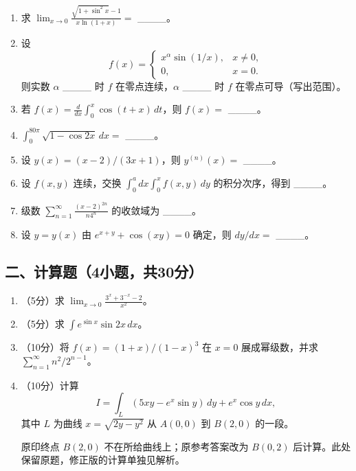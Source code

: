 \documentclass[11pt,fontset=fandol]{ctexart}
\begin{document}
\begin{enumerate}
\def\labelenumi{\arabic{enumi}.}
\item
  求 \(\displaystyle\lim_{x\to0}\frac{\sqrt{1+\sin^2x}-1}{x\ln(1+x)}=\)
  \_\_\_\_。
\item
  设 \[
  f(x)=\begin{cases}x^\alpha\sin(1/x),&x\ne0,\\0,&x=0.\end{cases}
  \] 则实数 \(\alpha\) \_\_\_\_ 时 \(f\) 在零点连续，\(\alpha\) \_\_\_\_
  时 \(f\) 在零点可导（写出范围）。
\item
  若 \(\displaystyle f(x)=\frac d{dx}\int_0^x\cos(t+x)\,dt\)，则
  \(f(x)=\) \_\_\_\_。
\item
  \(\displaystyle\int_0^{80\pi}\sqrt{1-\cos2x}\,dx=\) \_\_\_\_。
\item
  设 \(y(x)=(x-2)/(3x+1)\)，则 \(y^{(n)}(x)=\) \_\_\_\_。
\item
  设 \(f(x,y)\) 连续，交换
  \(\displaystyle\int_0^a dx\int_0^xf(x,y)\,dy\) 的积分次序，得到
  \_\_\_\_。
\item
  级数 \(\displaystyle\sum_{n=1}^\infty\frac{(x-2)^{2n}}{n4^n}\)
  的收敛域为 \_\_\_\_。
\item
  设 \(y=y(x)\) 由 \(e^{x+y}+\cos(xy)=0\) 确定，则 \(dy/dx=\) \_\_\_\_。
\end{enumerate}

\subsection{二、计算题（4小题，共30分）}\label{ux4e8cux8ba1ux7b97ux98984ux5c0fux9898ux517130ux5206}

\begin{enumerate}
\def\labelenumi{\arabic{enumi}.}
\item
  （5分）求 \(\displaystyle\lim_{x\to0}\frac{3^x+3^{-x}-2}{x^2}\)。
\item
  （5分）求 \(\displaystyle\int e^{\sin x}\sin2x\,dx\)。
\item
  （10分）将 \(f(x)=(1+x)/(1-x)^3\) 在 \(x=0\) 展成幂级数，并求
  \(\displaystyle\sum_{n=1}^\infty n^2/2^{n-1}\)。
\item
  （10分）计算 \[
  I=\int_L(5xy-e^x\sin y)\,dy+e^x\cos y\,dx,
  \] 其中 \(L\) 为曲线 \(x=\sqrt{2y-y^2}\) 从 \(A(0,0)\) 到 \(B(2,0)\)
  的一段。

  原印终点 \(B(2,0)\) 不在所给曲线上；原参考答案改为 \(B(0,2)\)
  后计算。此处保留原题，修正版的计算单独见解析。
\end{enumerate}
\end{document}
